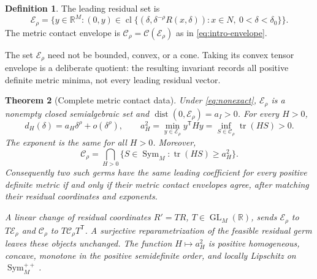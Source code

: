 \documentclass[11pt,reqno]{amsart}
\numberwithin{equation}{section}
\newtheorem{theorem}{Theorem}[section]
\theoremstyle{definition}
\newtheorem{definition}[theorem]{Definition}
\theoremstyle{remark}
\newcommand{\R}{\mathbb R}
\newcommand{\Sym}{\operatorname{Sym}}
\newcommand{\tr}{\operatorname{tr}}
\newcommand{\dist}{\operatorname{dist}}
\newcommand{\cl}{\operatorname{cl}}
\newcommand{\cE}{\mathcal E}
\newcommand{\cC}{\mathcal C}
\begin{document}
\begin{definition}\label{def:residual-set}
The leading residual set is
\[
 \cE_\rho=\{y\in\R^M:(0,y)\in
  \cl\{(\delta,\delta^{-\rho}R(x,\delta)):x\in N,\ 0<\delta<\delta_0\}\}.
\]
The metric contact envelope is $\cC_\rho=\mathcal C(\cE_\rho)$ as in \eqref{eq:intro-envelope}.
\end{definition}
The set $\cE_\rho$ need not be bounded, convex, or a cone. Taking its convex tensor envelope is a deliberate quotient: the resulting invariant records all positive definite metric minima, not every leading residual vector.

\begin{theorem}[Complete metric contact data]\label{thm:envelope}
Under \eqref{eq:nonexact}, $\cE_\rho$ is a nonempty closed semialgebraic set and $\dist(0,\cE_\rho)=a_I>0$. For every $H>0$,
\begin{equation}\label{eq:metric-coefficient}
 d_H(\delta)=a_H\delta^\rho+o(\delta^\rho),\qquad
 a_H^2=\min_{y\in\cE_\rho}y^{\mathsf T}Hy
       =\inf_{S\in\cC_\rho}\tr(HS)>0.
\end{equation}
The exponent is the same for all $H>0$. Moreover,
\begin{equation}\label{eq:envelope-reconstruction}
 \cC_\rho=\bigcap_{H>0}
       \{S\in\Sym_M:\tr(HS)\ge a_H^2\}.
\end{equation}
Consequently two such germs have the same leading coefficient for every positive definite metric if and only if their metric contact envelopes agree, after matching their residual coordinates and exponents.

A linear change of residual coordinates $R'=TR$, $T\in\operatorname{GL}_M(\R)$, sends $\cE_\rho$ to $T\cE_\rho$ and $\cC_\rho$ to $T\cC_\rho T^{\mathsf T}$. A surjective reparametrization of the feasible residual germ leaves these objects unchanged. The function $H\mapsto a_H^2$ is positive homogeneous, concave, monotone in the positive semidefinite order, and locally Lipschitz on $\Sym_M^{++}$.
\end{theorem}
\end{document}
